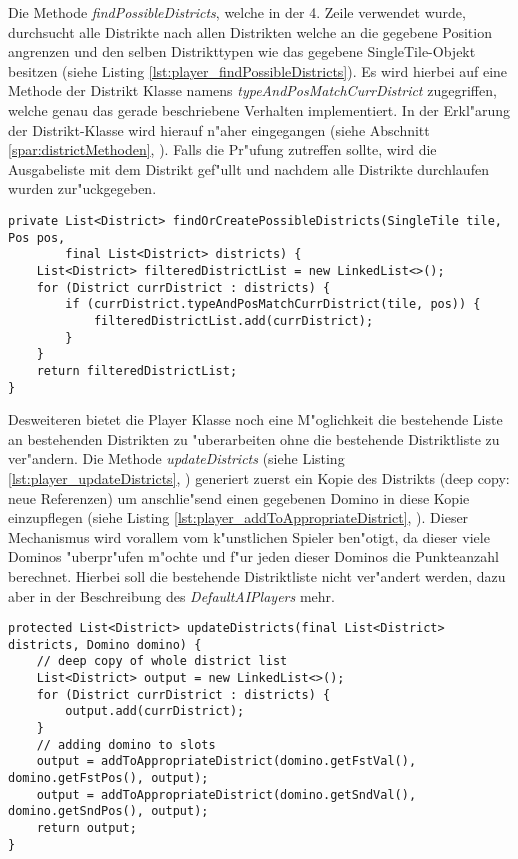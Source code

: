 Die Methode \emph{findPossibleDistricts}, welche in der 4. Zeile verwendet wurde, durchsucht alle Distrikte nach allen Distrikten welche an die gegebene Position angrenzen und den selben Distrikttypen wie das gegebene SingleTile-Objekt besitzen (siehe Listing \ref{lst:player_findPossibleDistricts}). Es wird hierbei auf eine Methode der Distrikt Klasse namens \emph{typeAndPosMatchCurrDistrict} zugegriffen, welche genau das gerade beschriebene Verhalten implementiert. In der Erkl"arung der Distrikt-Klasse wird hierauf n"aher eingegangen (siehe Abschnitt \ref{spar:districtMethoden}, ). Falls die Pr"ufung zutreffen sollte, wird die Ausgabeliste mit dem Distrikt gef"ullt und nachdem alle Distrikte durchlaufen wurden zur"uckgegeben. 
\begin{lstlisting}[style=CodeHighlighting,float,caption=Player - findPossibleDistricts,label=lst:player_findPossibleDistricts]
private List<District> findOrCreatePossibleDistricts(SingleTile tile, Pos pos, 
		final List<District> districts) {
    List<District> filteredDistrictList = new LinkedList<>();
    for (District currDistrict : districts) {
        if (currDistrict.typeAndPosMatchCurrDistrict(tile, pos)) {
            filteredDistrictList.add(currDistrict);
        }
    }
    return filteredDistrictList;
}
\end{lstlisting}

Desweiteren bietet die Player Klasse noch eine M"oglichkeit die bestehende Liste an bestehenden Distrikten zu "uberarbeiten ohne die bestehende Distriktliste zu ver"andern. Die Methode \emph{updateDistricts} (siehe Listing \ref{lst:player_updateDistricts}, ) generiert zuerst ein Kopie des Distrikts (deep copy: neue Referenzen) um anschlie"send einen gegebenen Domino in diese Kopie einzupflegen (siehe Listing \ref{lst:player_addToAppropriateDistrict}, ). Dieser Mechanismus wird vorallem vom k"unstlichen Spieler ben"otigt, da dieser viele Dominos "uberpr"ufen m"ochte und f"ur jeden dieser Dominos die Punkteanzahl berechnet. Hierbei soll die bestehende Distriktliste nicht ver"andert werden, dazu aber in der Beschreibung des \emph{DefaultAIPlayers} mehr. 
\begin{lstlisting}[style=CodeHighlighting,float,caption=Player - updateDistricts,label=lst:player_updateDistricts]
protected List<District> updateDistricts(final List<District> districts, Domino domino) {
    // deep copy of whole district list
    List<District> output = new LinkedList<>();
    for (District currDistrict : districts) {
        output.add(currDistrict);
    }
    // adding domino to slots
    output = addToAppropriateDistrict(domino.getFstVal(), domino.getFstPos(), output);
    output = addToAppropriateDistrict(domino.getSndVal(), domino.getSndPos(), output);
    return output;
}
\end{lstlisting}


